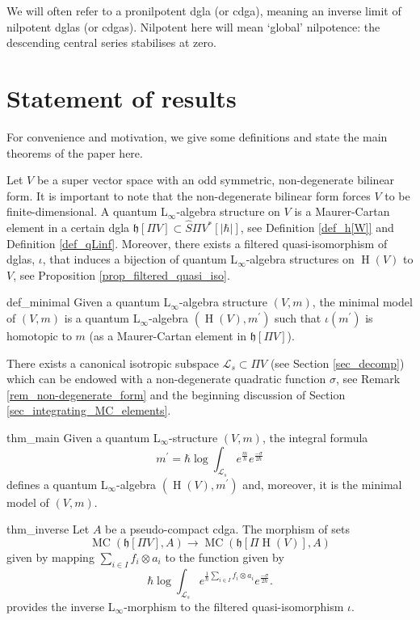 \documentclass[]{amsart}
\theoremstyle{definition}
\newcommand{\Linf}{L$_\infty$}
\newcommand{\MC}{\operatorname{MC}}
\newcommand{\homology}{\operatorname{H}}
\begin{document}
We will often refer to a pronilpotent dgla (or cdga), meaning an inverse limit of nilpotent dglas (or cdgas). Nilpotent here will mean `global' nilpotence: the descending central series stabilises at zero.

\section*{Statement of results}

For convenience and motivation, we give some definitions and state the main theorems of the paper here.

Let $V$ be a super vector space with an odd symmetric, non-degenerate bilinear form. It is important to note that the non-degenerate bilinear form forces $V$ to be finite-dimensional. A quantum \Linf-algebra structure on $V$ is a Maurer-Cartan element in a certain dgla $\mathfrak{h}[\Pi V]\subset\hat{S}\Pi V^*[|\hbar|]$, see Definition \ref{def_h[W]} and Definition \ref{def_qLinf}. Moreover, there exists a filtered quasi-isomorphism of dglas, $\iota$, that induces a bijection of quantum \Linf-algebra structures on $\homology (V)$ to $V$, see Proposition \ref{prop_filtered_quasi_iso}.

\begin{repdefinition}{def_minimal}
Given a quantum \Linf-algebra structure $(V,m)$, the minimal model of $(V,m)$ is a quantum \Linf-algebra $(\homology(V),m^\prime)$ such that $\iota(m^\prime)$ is homotopic to $m$ (as a Maurer-Cartan element in $\mathfrak{h}[\Pi V]$).
\end{repdefinition}

There exists a canonical isotropic subspace $\mathcal{L}_s\subset \Pi V$ (see Section \ref{sec_decomp}) which can be endowed with a non-degenerate quadratic function $\sigma$, see Remark \ref{rem_non-degenerate_form} and the beginning discussion of Section \ref{sec_integrating_MC_elements}.

\begin{reptheorem}{thm_main}
Given a quantum \Linf-structure $(V,m)$, the integral formula
\[
m^\prime = \hbar \log \int_{ \mathcal{L}_s} e^{\frac{m}{\hbar}}e^{\frac{-\sigma}{2\hbar}}
\]
defines a quantum \Linf-algebra $(\homology(V),m^\prime)$ and, moreover, it is the minimal model of $(V,m)$.
\end{reptheorem}

\begin{reptheorem}{thm_inverse}
Let $A$ be a pseudo-compact cdga. The morphism of sets 
\[
\MC (\mathfrak{h}[\Pi V],A)\to\MC (\mathfrak{h}[\Pi \homology (V)],A)
\]
given by mapping $\sum_{i\in I}f_i\otimes a_i $ to the function given by
\[
\hbar\log\int_{\mathcal{L}_s} e^{\frac{1}{\hbar}\sum_{i\in I} f_i\otimes a_i} e^{\frac{-\sigma}{2\hbar}}.
\]
provides the inverse \Linf-morphism to the filtered quasi-isomorphism $\iota$.
\end{reptheorem}
\end{document}
